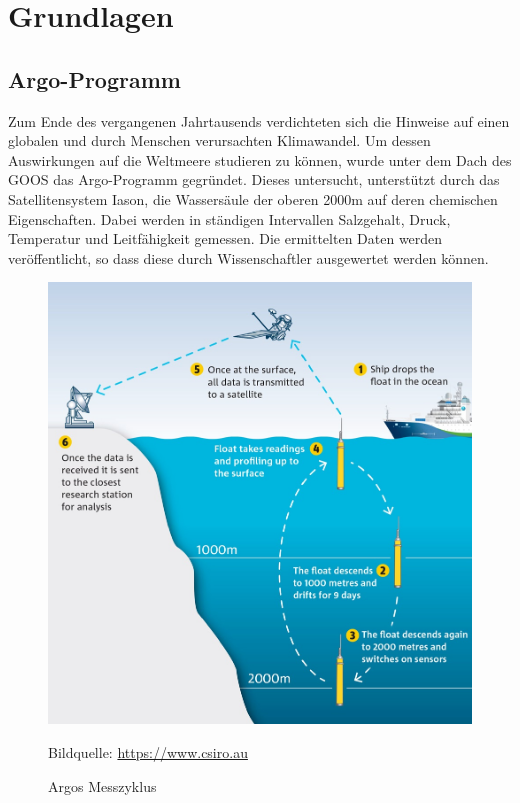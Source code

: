 \section{Grundlagen}




    \subsection{Argo-Programm}


    Zum Ende des vergangenen Jahrtausends verdichteten sich die Hinweise auf einen globalen und durch Menschen verursachten Klimawandel. Um dessen Auswirkungen auf die Weltmeere studieren zu können, wurde unter dem Dach des \gls{GOOS} das Argo-Programm gegründet. Dieses untersucht, unterstützt durch das Satellitensystem Iason, die Wassersäule der oberen 2000m auf deren chemischen Eigenschaften. Dabei werden in ständigen Intervallen Salzgehalt, Druck, Temperatur und Leitfähigkeit gemessen. Die ermittelten Daten werden veröffentlicht, so dass diese durch Wissenschaftler ausgewertet werden können.


    \begin{figure}[h]
        \centering
        \includegraphics{pix/operation_park_profile.jpg}
        \caption[Argos Messzyklus]{Argos  Messzyklus}
        \footnotesize{
            Bildquelle: \href{https://www.csiro.au/en/Research/OandA/Areas/Marine-technologies/Argo-robotic-floats}
                        {\url{https://www.csiro.au}}
        }
        \label{fig:Argo-messzyklus}
    \end{figure}

